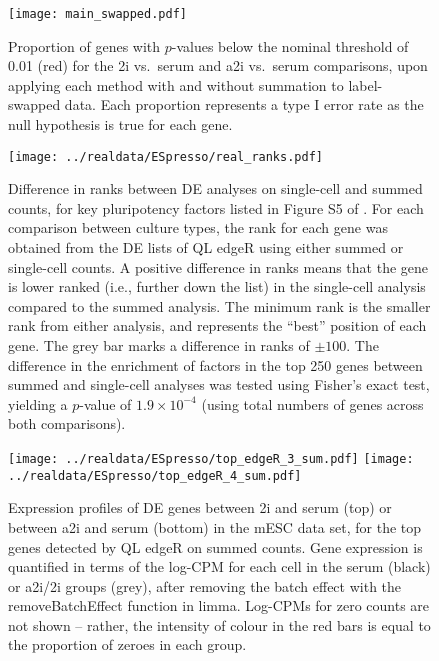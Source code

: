 \documentclass{article}
\newcommand\revised[1]{#1} %
\begin{document}
\begin{figure}[!p]
\begin{center}
    \texttt{[image: main\_swapped.pdf]}
\end{center}
\caption{
    Proportion of genes with $p$-values below the nominal threshold of 0.01 (red) for the 2i vs.\ serum and a2i vs.\ serum comparisons, upon applying each method with and without summation to label-swapped data.
    Each proportion represents a type I error rate as the null hypothesis is true for each gene.
}
\label{fig:realswap}
\end{figure}

\begin{figure}[p]
\begin{center}
    \texttt{[image: ../realdata/ESpresso/real\_ranks.pdf]}
\end{center}
\caption{
    Difference in ranks between DE analyses on single-cell and summed counts, for key pluripotency factors listed in Figure S5 of \cite{kolod2015single}.
    For each comparison between culture types, the rank for each gene was obtained from the DE lists of QL edgeR using either summed or single-cell counts.
    A positive difference in ranks means that the gene is lower ranked (i.e., further down the list) in the single-cell analysis compared to the summed analysis.
    The minimum rank is the smaller rank from either analysis, and represents the ``best'' position of each gene.
    The grey bar marks a difference in ranks of $\pm100$.
    The difference in the enrichment of factors in the top 250 genes between summed and single-cell analyses was tested using Fisher's exact test, yielding a $p$-value of $1.9 \times 10^{-4}$ (using total numbers of genes across both comparisons). 
}
\end{figure}

\begin{figure}[p]
    \begin{center}
        \texttt{[image: ../realdata/ESpresso/top\_edgeR\_3\_sum.pdf]}
        \texttt{[image: ../realdata/ESpresso/top\_edgeR\_4\_sum.pdf]}
    \end{center}
\caption{
    Expression profiles of DE genes between 2i and serum (top) or between a2i and serum (bottom) in the mESC data set, for the top genes detected by QL edgeR on summed counts.
    \revised{Gene expression is quantified in terms of the log-CPM for each cell in the serum (black) or a2i/2i groups (grey), after removing the batch effect with the removeBatchEffect function in limma.
    Log-CPMs for zero counts are not shown -- rather, the intensity of colour in the red bars is equal to the proportion of zeroes in each group.}
}
\label{fig:realdata}
\end{figure}

 
\end{document}
